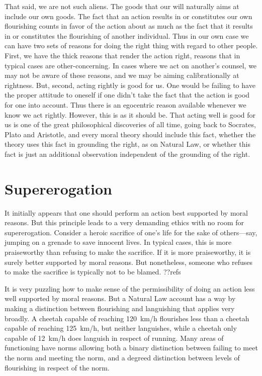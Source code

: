 That said, we are not such aliens. The goods that our will naturally aims at include our own goods. The fact that an action 
results in or constitutes our own flourishing counts in favor of the action about as much as the fact that it results in or constitutes the
flourishing of another individual. Thus in our own case we can have two sets of reasons for doing the right thing with regard to other
people. First, we have the thick reasons that render the action right, reasons that in typical cases are other-concerning. In cases where
we act on another's counsel, we may not be aware of these reasons, and we may be aiming calibrationally at rightness. But, second, acting
rightly is good for us. One would be failing to have the proper attitude to oneself if one didn't take the fact that the action is good
for one into account. Thus there is an egocentric reason available whenever we know we act rightly. However, this is as it should be.
That acting well is good for us is one of the great philosophical discoveries of all time, going back to Socrates, Plato and Aristotle,
and every moral theory should include this fact, whether the theory uses this fact in grounding the right, as on Natural Law, or whether
this fact is just an additional observation independent of the grounding of the right. 


\section{Supererogation}
It initially appears that one should perform an action best supported by moral reasons. But this principle
leads to a very demanding ethics with no room for supererogation. Consider a heroic sacrifice of one's life for
the sake of others---say, jumping on a grenade to save innocent lives. In typical cases, this is more praiseworthy 
than refusing to make the sacrifice. If it is more praiseworthy, it is surely better supported by moral reasons. 
But nonetheless, someone who refuses to make the sacrifice is typically not to be blamed. ??refs

It is very puzzling how to make sense of the permissibility of doing an action less well supported by moral reasons. 
But a Natural Law account has a way by making a distinction between flourishing and languishing that applies very
broadly. A cheetah capable of reaching 120~km/h flourishes less than a cheetah capable of reaching 125~km/h, but 
neither languishes, while a cheetah only capable of 12~km/h does languish in respect of running. Many areas of 
functioning have norms allowing both a binary distinction between failing to meet the norm and meeting the norm,
and a degreed distinction between levels of flourishing in respect of the norm. 

